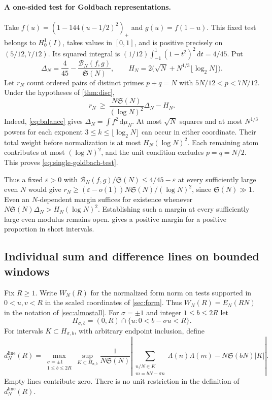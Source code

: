 \documentclass[11pt,a4paper]{article}
\numberwithin{equation}{section}
\newcommand{\SSS}{\mathfrak S}
\newcommand{\ud}{\mathrm d}
\newcommand{\B}{\mathcal B_N}
\begin{document}
\paragraph{A one-sided test for Goldbach representations.}
Take $f(u)=(1-144(u-1/2)^2)_+$ and $g(u)=f(1-u)$.
This fixed test belongs to $H^1_0(I)$, takes values in $[0,1]$,
and is positive precisely on $(5/12,7/12)$. Its squared integral
is $(1/12)\int_{-1}^1(1-t^2)^2\,\ud t=4/45$. Put
\[
  \Delta_N=\frac4{45}-\frac{\B(f,g)}{\SSS(N)},\qquad
  H_N=2\bigl(\sqrt N+N^{1/3}\lfloor\log_2 N\rfloor\bigr).
\]
Let $r_N$ count ordered pairs of distinct primes $p+q=N$ with
$5N/12<p<7N/12$. Under the hypotheses of \cref{thm:disc},
\begin{equation}
 r_N\ \ge\ \frac{N\SSS(N)}{(\log N)^2}\Delta_N-H_N .
 \label{eq:single-goldbach-test}
\end{equation}
Indeed, \cref{eq:balance} gives $\Delta_N=\int f^2\,\ud\mu_N$.
At most $\sqrt N$ squares and at most $N^{1/3}$ powers for
each exponent $3\le k\le\lfloor\log_2 N\rfloor$ can occur in
either coordinate. Their total weight before normalization is
at most $H_N(\log N)^2$. Each remaining atom contributes at
most $(\log N)^2$, and the unit condition excludes $p=q=N/2$.
This proves \cref{eq:single-goldbach-test}.

Thus a fixed $\varepsilon>0$ with
$\B(f,g)/\SSS(N)\le 4/45-\varepsilon$ at every sufficiently
large even $N$ would give
$r_N\ge(\varepsilon-o(1))N\SSS(N)/(\log N)^2$, since
$\SSS(N)\gg1$. Even an $N$-dependent margin suffices for
existence whenever $N\SSS(N)\Delta_N>H_N(\log N)^2$.
Establishing such a margin at every sufficiently large even
modulus remains open.  gives
a positive margin for a positive proportion in short intervals.

\subsection{Individual sum and difference lines on bounded windows}

Fix $R\ge1$. Write $W_N(R)$ for the normalized form norm
on tests supported in $0<u,v<R$ in the scaled coordinates
of \cref{sec:form}. Thus $W_N(R)=E_N(RN)$ in the notation
of \cref{sec:almostall}. For $\sigma=\pm1$ and integer
$1\le b\le2R$ let
\[
 H_{\sigma,b}=(0,R)\cap\{u:0<b-\sigma u<R\}.
\]
For intervals $K\subset H_{\sigma,b}$, with arbitrary endpoint
inclusion, define
\[
 d_N^{\mathrm{line}}(R)=
 \max_{\substack{\sigma=\pm1\\ 1\le b\le 2R}}
 \sup_{K\subset H_{\sigma,b}}
 \frac1{N\SSS(N)}
 \left|
 \sum_{\substack{n/N\in K\\m=bN-\sigma n}}\Lambda(n)\Lambda(m)
             -N\SSS(bN)|K|
 \right|.
\]
Empty lines contribute zero. There is no unit restriction
in the definition of $d_N^{\mathrm{line}}(R)$.
\end{document}
